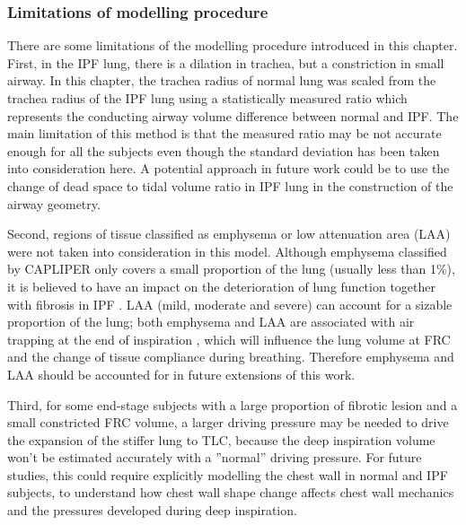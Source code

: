 \subsubsection{Limitations of modelling procedure}
There are some limitations of the modelling procedure introduced in this chapter. First, in the IPF lung, there is a dilation in trachea, but a constriction in small airway. In this chapter, the trachea radius of normal lung was scaled from the trachea radius of the IPF lung using a statistically measured ratio which represents the conducting airway volume difference between normal and IPF. The main limitation of this method is that the measured ratio may be not accurate enough for all the subjects even though the standard deviation has been taken into consideration here. A potential approach in future work could be to use the change of dead space to tidal volume ratio in IPF lung in the construction of the airway geometry. 

Second, regions of tissue classified as emphysema or low attenuation area (LAA) were not taken into consideration in this model. Although emphysema classified by CAPLIPER only covers a small proportion of the lung (usually less than 1\%), it is believed to have an impact on the deterioration of lung function together with fibrosis in IPF \citep{cottin2005combined, king2011idiopathic, lin2015combined}. LAA (mild, moderate and severe) can account for a sizable proportion of the lung; both emphysema and LAA are associated with air trapping at the end of inspiration \citep{slebos2015air, hoesein2017air}, which will influence the lung volume at FRC and the change of tissue compliance during breathing. Therefore emphysema and LAA should be accounted for in future extensions of this work.

Third, for some end-stage subjects with a large proportion of fibrotic lesion and a small constricted FRC volume, a larger driving pressure may be needed to drive the expansion of the stiffer lung to TLC, because the deep inspiration volume won't be estimated accurately with a ''normal'' driving pressure. For future studies, this could require explicitly modelling the chest wall in normal and IPF subjects, to understand how chest wall shape change affects chest wall mechanics and the pressures developed during deep inspiration.
\newpage

